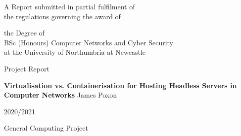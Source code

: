
\begin{titlepage}
\Large
A Report submitted in partial fulfilment of\\
 the regulations governing the award of
\par
the Degree of\\[5mm]
{\huge	 BSc (Honours) Computer Networks and Cyber Security }\\[5mm]
at the University of Northumbria at Newcastle
\par
\vspace*{1in}
{\Large Project Report}
\par\vspace{1em}
{\Huge \bfseries Virtualisation vs. Containerisation for Hosting Headless Servers in Computer Networks}
\vfill
James Poxon
\par\vspace{1em}
2020/2021
\par\vspace{1em}
General Computing Project
\end{titlepage}

